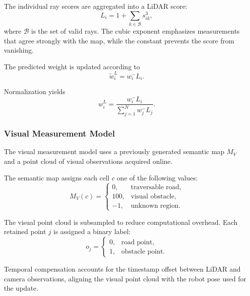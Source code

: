 \documentclass[a4paper,11pt,oneside]{book}
\begin{document}
The individual ray scores are aggregated into a LiDAR score:
\begin{equation}
    L_i
    =
    1+\sum_{k\in\mathcal{B}}s_{ik}^{3},
    \label{eq:lidar_particle_score}
\end{equation}
where $\mathcal{B}$ is the set of valid rays. The cubic exponent
emphasizes measurements that agree strongly with the map,
while the constant prevents the score from vanishing.

The predicted weight is updated according to
\begin{equation}
    \widetilde{w}_i^{L}
    =
    w_i^{-}L_i.
\end{equation}

Normalization yields
\begin{equation}
    w_i^{L}
    =
    \frac{w_i^{-}L_i}
    {\displaystyle\sum_{j=1}^{N}w_j^{-}L_j}.
    \label{eq:lidar_weight_update}
\end{equation}

\subsubsection{Visual Measurement Model}

The visual measurement model uses a previously generated semantic
map $M_V$ and a point cloud of visual observations acquired online.

The semantic map assigns each cell $c$ one of the following values:
\begin{equation}
    M_V(c)
    =
    \begin{cases}
        0,   & \text{traversable road}, \\
        100, & \text{visual obstacle}, \\
        -1,  & \text{unknown region}.
    \end{cases}
\end{equation}

The visual point cloud is subsampled to reduce computational
overhead. Each retained point $j$ is assigned a binary label:
\begin{equation}
    o_j
    =
    \begin{cases}
        0, & \text{road point}, \\
        1, & \text{obstacle point}.
    \end{cases}
\end{equation}

Temporal compensation accounts for the timestamp offset between
LiDAR and camera observations, aligning the visual point cloud
with the robot pose used for the update.
\end{document}
